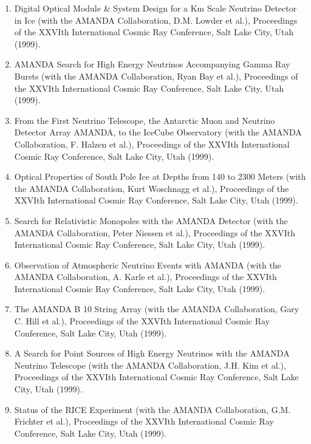 \begin{enumerate}
\item Digital Optical Module \& System Design for a Km Scale Neutrino
  Detector in Ice (with the AMANDA Collaboration, D.M. Lowder et al.),
  Proceedings of the XXVIth International Cosmic Ray Conference, Salt
  Lake City, Utah (1999).

\item AMANDA Search for High Energy Neutrinos Accompanying Gamma Ray
  Bursts (with the AMANDA Collaboration, Ryan Bay et al.), Proceedings
  of the XXVIth International Cosmic Ray Conference, Salt Lake City,
  Utah (1999).

\item From the First Neutrino Telescope, the Antarctic Muon and
  Neutrino Detector Array AMANDA, to the IceCube Observatory (with the
  AMANDA Collaboration, F. Halzen et al.), Proceedings of the XXVIth
  International Cosmic Ray Conference, Salt Lake City, Utah (1999).

\item Optical Properties of South Pole Ice at Depths from 140 to 2300
  Meters (with the AMANDA Collaboration, Kurt Woschnagg et al.),
  Proceedings of the XXVIth International Cosmic Ray Conference, Salt
  Lake City, Utah (1999).

\item Search for Relativistic Monopoles with the AMANDA Detector (with
  the AMANDA Collaboration, Peter Niessen et al.), Proceedings of the
  XXVIth International Cosmic Ray Conference, Salt Lake City, Utah
  (1999).

\item Observation of Atmospheric Neutrino Events with AMANDA (with the
  AMANDA Collaboration, A. Karle et al.), Proceedings of the XXVIth
  International Cosmic Ray Conference, Salt Lake City, Utah (1999).

\item The AMANDA B 10 String Array (with the AMANDA Collaboration,
  Gary C. Hill et al.), Proceedings of the XXVIth International Cosmic
  Ray Conference, Salt Lake City, Utah (1999).

\item A Search for Point Sources of High Energy Neutrinos with the
  AMANDA Neutrino Telescope (with the AMANDA Collaboration, J.H. Kim
  et al.), Proceedings of the XXVIth International Cosmic Ray
  Conference, Salt Lake City, Utah (1999).

\item Status of the RICE Experiment (with the AMANDA Collaboration,
  G.M. Frichter et al.), Proceedings of the XXVIth International
  Cosmic Ray Conference, Salt Lake City, Utah (1999).


\end{enumerate}
